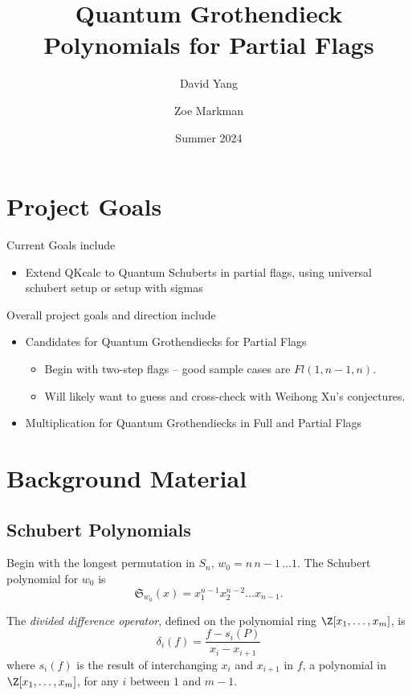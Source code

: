 \documentclass[11pt]{article}
\begin{document}
\title{\textbf{Quantum Grothendieck Polynomials for Partial Flags}}
\author{David Yang \and Zoe Markman}
\date{Summer 2024}

\maketitle

\section{Project Goals}

Current Goals include
\begin{itemize}
    \item Extend QKcalc to Quantum Schuberts in partial flags, using universal schubert setup or setup with sigmas
\end{itemize}

Overall project goals and direction include

\begin{itemize}
    \item Candidates for Quantum Grothendiecks for Partial Flags \begin{itemize}
        \item Begin with two-step flags -- good sample cases are $Fl(1, n-1, n)$.
        \item Will likely want to guess and cross-check with Weihong Xu's conjectures.
    \end{itemize}
    \item Multiplication for Quantum Grothendiecks in Full and Partial Flags
\end{itemize}

\section{Background Material}
\subsection{Schubert Polynomials}

Begin with the longest permutation in $S_n$, $w_0 = n \, n-1 \, \dots 1$. The Schubert polynomial for $w_0$ is
\[
    \mathfrak{S}_{w_0}(x) = x_1^{n-1} x_2^{n-2} \dots x_{n-1}.
\]

\begin{definition}
The \textit{divided difference operator}, defined on the polynomial ring $\Z[x_1, \dots, x_m]$, is
\[
    \delta_i(f) = \frac{f - s_i(P)}{x_i - x_{i+1}}
\] 
where $s_i(f)$ is the result of interchanging $x_i$ and $x_{i+1}$ in $f$, a polynomial in $\Z[x_1, \dots, x_m]$, for any $i$ between $1$ and $m-1$.
\end{definition}
\end{document}
